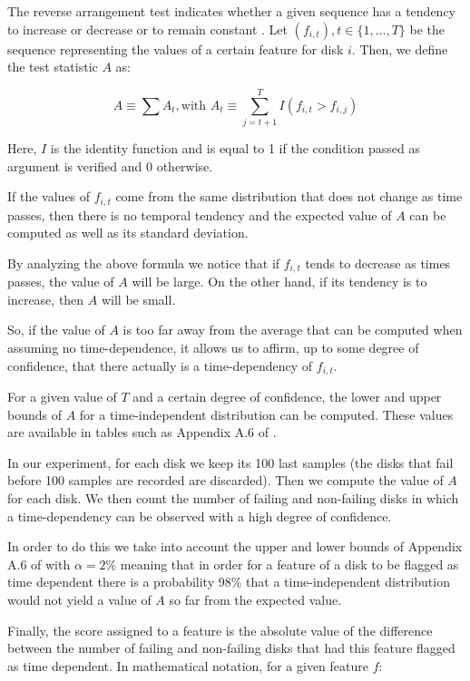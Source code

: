 The reverse arrangement test indicates whether a given sequence has a tendency to increase or decrease or to remain constant \cite{Murray2005}.
Let $(f_{i,t}), t \in \{1,\dots,T\}$ be the sequence representing the values of a certain feature for disk $i$.
Then, we define the test statistic $A$ as:

\begin{equation}\label{eq:reverse_arrangement}
  A \equiv \sum A_t, \text{with } A_t \equiv \sum_{j=t+1}^{T} I(f_{i, t} > f_{i, j})
\end{equation}

Here, $I$ is the identity function and is equal to 1 if the condition passed as argument is verified and 0 otherwise.

If the values of $f_{i,t}$ come from the same distribution that does not change as time passes, then there is no temporal tendency and the expected value of $A$ can be computed as well as its standard deviation.

By analyzing the above formula we notice that if $f_{i,t}$ tends to decrease as times passes, the value of $A$ will be large.
On the other hand, if its tendency is to increase, then $A$ will be small.

So, if the value of $A$ is too far away from the average that can be computed when assuming no time-dependence, it allows us to affirm, up to some degree of confidence, that there actually is a time-dependency of $f_{i,t}$.

For a given value of $T$ and a certain degree of confidence, the lower and upper bounds of $A$ for a time-independent distribution can be computed.
These values are available in tables such as Appendix A.6 of \cite{bendat2011random}.

In our experiment, for each disk we keep its 100 last samples (the disks that fail before 100 samples are recorded are discarded).
Then we compute the value of $A$ for each disk.
We then count the number of failing and non-failing disks in which a time-dependency can be observed with a high degree of confidence.

In order to do this we take into account the upper and lower bounds of Appendix A.6 of \cite{bendat2011random} with $\alpha = 2\%$ meaning that in order for a feature of a disk to be flagged as time dependent there is a probability 98\% that a time-independent distribution would not yield a value of $A$ so far from the expected value.

Finally, the score assigned to a feature is the absolute value of the difference between the number of failing and non-failing disks that had this feature flagged as time dependent.
In mathematical notation, for a given feature $f$:

